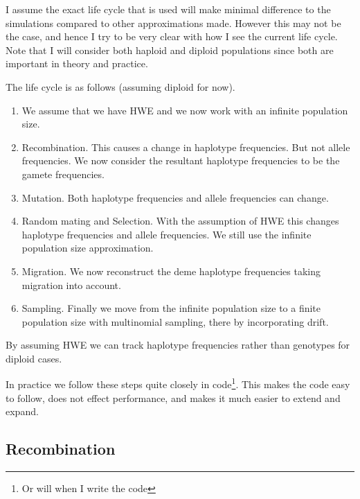 \documentclass{article}
\begin{document}
I assume the exact life cycle that is used will make minimal difference to the
simulations compared to other approximations made. However this may not be the
case, and hence I try to be very clear with how I see the current life cycle.
Note that I will consider both haploid and diploid populations since both are
important in theory and practice. 

The life cycle is as follows (assuming diploid for now).
\begin{enumerate}
  \item  We assume that we have HWE and we now work with an
  infinite population size. 
  \item Recombination. This causes a change in haplotype frequencies. But not
  allele frequencies. We now consider the resultant haplotype frequencies to be
  the gamete frequencies.
  \item Mutation. Both haplotype frequencies and allele frequencies can change.
  \item Random mating and Selection. With the assumption of HWE this changes
  haplotype frequencies and allele frequencies. We still use the infinite
  population size approximation. 
  \item Migration. We now reconstruct the deme haplotype frequencies taking
  migration into account. 
  \item Sampling. Finally we move from the infinite population size to a finite
  population size with multinomial sampling, there by incorporating drift. 
\end{enumerate}
By assuming HWE we can track haplotype frequencies rather than genotypes for
diploid cases.

In practice we follow these steps quite closely in code\footnote{Or will
when I write the code}. This makes the code easy to follow, does not effect
performance, and makes it much easier to extend and expand.

\subsection{Recombination} 
\end{document}
